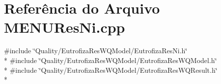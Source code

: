 \section{Referência do Arquivo M\+E\+N\+U\+Res\+Ni.\+cpp}
\label{_m_e_n_u_res_ni_8cpp}
{\ttfamily \#include \char`\"{}Quality/\+Eutrofiza\+Res\+W\+Q\+Model/\+Eutrofiza\+Res\+Ni.\+h\char`\"{}}\\*
{\ttfamily \#include \char`\"{}Quality/\+Eutrofiza\+Res\+W\+Q\+Model/\+Eutrofiza\+Res\+W\+Q\+Model.\+h\char`\"{}}\\*
{\ttfamily \#include \char`\"{}Quality/\+Eutrofiza\+Res\+W\+Q\+Model/\+Eutrofiza\+Res\+W\+Q\+Result.\+h\char`\"{}}\\*
